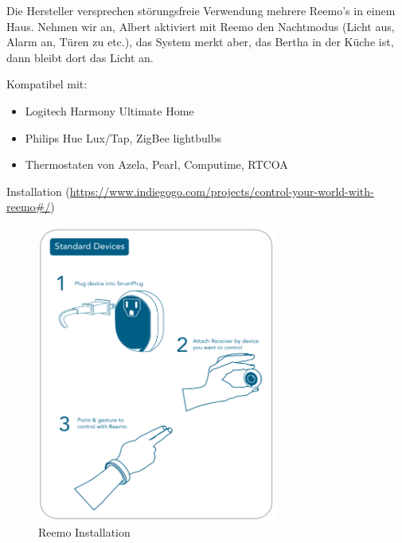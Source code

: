 Die Hersteller versprechen störungsfreie Verwendung mehrere Reemo's in einem Haus. Nehmen wir
an, Albert aktiviert mit Reemo den Nachtmodus (Licht aus, Alarm an, Türen zu etc.), das System
merkt aber, das Bertha in der Küche ist, dann bleibt dort das Licht an.

\noindent
Kompatibel mit:
\begin{itemize}
\item Logitech Harmony Ultimate Home
\item Philips Hue Lux/Tap, ZigBee lightbulbs
\item Thermostaten von Azela, Pearl, Computime, RTCOA
\end{itemize}

\newpage
\noindent
Installation (\url{https://www.indiegogo.com/projects/control-your-world-with-reemo#/})

\begin{figure}[h!]
	\centering
	\includegraphics[width=0.7\textwidth]{img/Feedback-Mechanismen/ReemoInstallation1.png}
	\caption{Reemo Installation}
	\label{fig:feedbackReemoInstallation1}
\end{figure}

